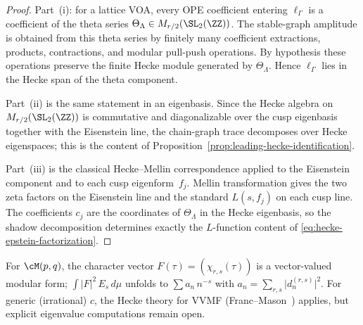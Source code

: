 \begin{proof}
Part~(i): for a lattice VOA, every OPE coefficient entering
$\ell_\Gamma$ is a coefficient of the theta series
$\Theta_\Lambda \in M_{r/2}(\SL_2(\ZZ))$. The stable-graph amplitude is
obtained from this theta series by finitely many coefficient
extractions, products, contractions, and modular pull-push operations.
By hypothesis these operations preserve the finite Hecke module
generated by $\Theta_\Lambda$. Hence $\ell_\Gamma$ lies in the Hecke
span of the theta component.

Part~(ii) is the same statement in an eigenbasis. Since the Hecke algebra
on $M_{r/2}(\SL_2(\ZZ))$ is commutative and diagonalizable over the cusp
eigenbasis together with the Eisenstein line, the chain-graph trace
decomposes over Hecke eigenspaces; this is the content of
Proposition~\ref{prop:leading-hecke-identification}.

Part~(iii) is the classical Hecke--Mellin correspondence applied to the
Eisenstein component and to each cusp eigenform~$f_j$. Mellin
transformation gives the two zeta factors on the Eisenstein line and the
standard $L(s,f_j)$ on each cusp line. The coefficients $c_j$ are the
coordinates of $\Theta_\Lambda$ in the Hecke eigenbasis, so the shadow
decomposition determines exactly the $L$-function content of
\eqref{eq:hecke-epstein-factorization}.
\end{proof}

\begin{remark}
\label{rem:virasoro-character-vector}
\label{rem:vvmf-rankin-selberg}
\label{rem:vvmf-hecke-decomposition}
\label{rem:virasoro-generic-frontier}
\label{rem:mellin-continuation-functor}
\label{rem:lattice-vs-nonlattice}
For $\cM(p,q)$, the character vector
$F(\tau) = (\chi_{r,s}(\tau))$ is a vector-valued modular form;
$\int \lvert F\rvert^2\,E_s\,d\mu$ unfolds to
$\sum a_n\,n^{-s}$ with $a_n = \sum_{r,s}\lvert d_n^{(r,s)}\rvert^2$.
For generic (irrational) $c$, the Hecke theory for VVMF
(Franc--Mason~\cite{FrancMason2017}) applies, but explicit eigenvalue
computations remain open.
\end{remark}

